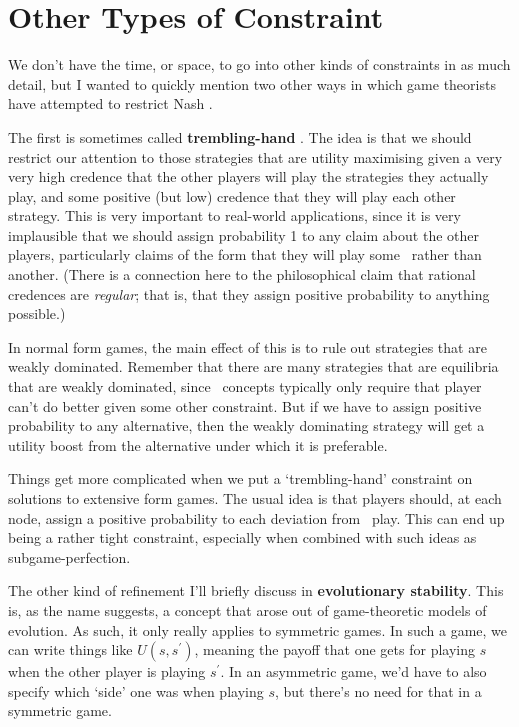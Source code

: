\section{Other Types of Constraint}

We don't have the time, or space, to go into other kinds of constraints in as much detail, but I wanted to quickly mention two other ways in which game theorists have attempted to restrict Nash \eqm.

The first is sometimes called \textbf{trembling-hand \eqm}. The idea is that we should restrict our attention to those strategies that are utility maximising given a very very high credence that the other players will play the strategies they actually play, and some positive (but low) credence that they will play each other strategy. This is very important to real-world applications, since it is very implausible that we should assign probability 1 to any claim about the other players, particularly claims of the form that they will play some \eqm\ rather than another. (There is a connection here to the philosophical claim that rational credences are \textit{regular}; that is, that they assign positive probability to anything possible.)

In normal form games, the main effect of this is to rule out strategies that are weakly dominated. Remember that there are many strategies that are equilibria that are weakly dominated, since \eqm\ concepts typically only require that player can't do better given some other constraint. But if we have to assign positive probability to any alternative, then the weakly dominating strategy will get a utility boost from the alternative under which it is preferable.

Things get more complicated when we put a `trembling-hand' constraint on solutions to extensive form games. The usual idea is that players should, at each node, assign a positive probability to each deviation from \eqm\ play. This can end up being a rather tight constraint, especially when combined with such ideas as subgame-perfection.

The other kind of refinement I'll briefly discuss in \textbf{evolutionary stability}. This is, as the name suggests, a concept that arose out of game-theoretic models of evolution. As such, it only really applies to symmetric games. In such a game, we can write things like $U(s, s^\prime)$, meaning the payoff that one gets for playing $s$ when the other player is playing $s^\prime$. In an asymmetric game, we'd have to also specify which `side' one was when playing $s$, but there's no need for that in a symmetric game.

